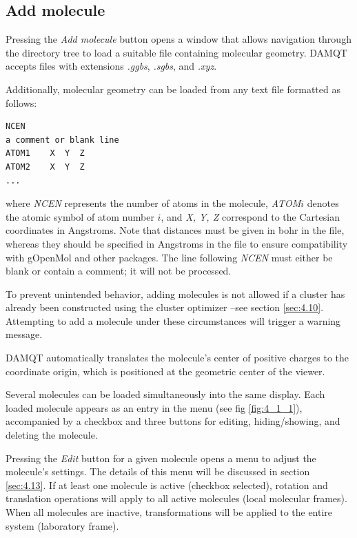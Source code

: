 \documentclass[10pt]{article}
\begin{document}
\subsection{Add molecule \label{sec:4.1}}

Pressing the {\it Add molecule} button opens a window that allows navigation through the directory tree  
to load a suitable file containing molecular geometry. DAMQT accepts files with extensions {\it .ggbs}, {\it .sgbs},  
and {\it .xyz}.  

Additionally, molecular geometry can be loaded from any text file formatted as follows:

\begin{verbatim}
NCEN
a comment or blank line
ATOM1    X  Y  Z
ATOM2    X  Y  Z
...
\end{verbatim}

where {\it NCEN} represents the number of atoms in the molecule, {\it ATOM}$i$ denotes  
the atomic symbol of atom number $i$, and {\it X, Y, Z} correspond to the Cartesian coordinates in Angstroms.  
Note that distances must be given in bohr in the \ggbs{ } file, whereas they should be specified  
in Angstroms in the \xyz{ } file to ensure compatibility with gOpenMol and other packages.  
The line following {\it NCEN} must either be blank or contain a comment; it will not be processed.  

To prevent unintended behavior, adding molecules is not allowed if a cluster has already been  
constructed using the cluster optimizer --see section \ref{sec:4.10}.  
Attempting to add a molecule under these circumstances will trigger a warning message.  

DAMQT automatically translates the molecule's center of positive charges to the coordinate origin,  
which is positioned at the geometric center of the viewer.  

\vspace*{5mm}{\bf Managing Multiple Molecules}\vspace*{5mm}  

Several molecules can be loaded simultaneously into the same display. Each loaded molecule appears  
as an entry in the menu (see fig \ref{fig:4_1_1}), accompanied by a checkbox and three buttons  
for editing, hiding/showing, and deleting the molecule.  

Pressing the {\it Edit} button for a given molecule opens a menu  
to adjust the molecule’s settings. The details of this menu will be discussed in section \ref{sec:4.13}.  
If at least one molecule is active (checkbox selected), rotation and translation operations  
will apply to all active molecules (local molecular frames).  
When all molecules are inactive, transformations will be applied to the entire system  
(laboratory frame).  
\end{document}
